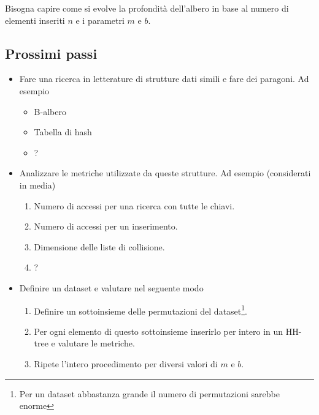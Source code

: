 \documentclass[a4paper]{article}
\begin{document}
Bisogna capire come si evolve la profondità dell'albero in base al numero di elementi inseriti $n$ e i parametri $m$ e $b$.

\subsection*{Prossimi passi}
\begin{itemize}
	\item Fare una ricerca in letterature di strutture dati simili e fare dei paragoni. Ad esempio
		\begin{itemize}
			\item B-albero
			\item Tabella di hash
			\item ?
		\end{itemize}
	\item Analizzare le metriche utilizzate da queste strutture. Ad esempio (considerati in media)
		\begin{enumerate}
			\item Numero di accessi per una ricerca con tutte le chiavi.
			\item Numero di accessi per un inserimento.
			\item Dimensione delle liste di collisione.
			\item ?
		\end{enumerate}
	\item Definire un dataset e valutare nel seguente modo
		\begin{enumerate}
			\item Definire un sottoinsieme delle permutazioni del dataset\footnote{Per un dataset abbastanza grande il numero di permutazioni sarebbe enorme}.
			\item Per ogni elemento di questo sottoinsieme inserirlo per intero in un HH-tree e valutare le metriche.
			\item Ripete l'intero procedimento per diversi valori di $m$ e $b$.
		\end{enumerate}
\end{itemize}
\end{document}
